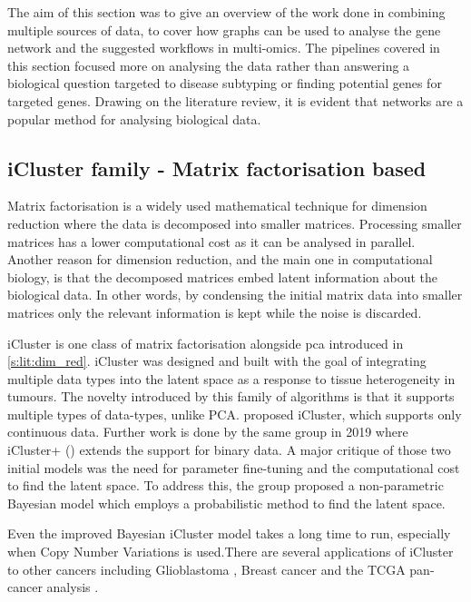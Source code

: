 The aim of this section was to give an overview of the work done in combining multiple sources of data, to cover how graphs can be used to analyse the gene network and the suggested workflows in multi-omics. The pipelines covered in this section focused more on analysing the data rather than answering a biological question targeted to disease subtyping or finding potential genes for targeted genes. Drawing on the literature review, it is evident that networks are a popular method for analysing biological data.

\subsection{iCluster family - Matrix factorisation based} \label{s:lit:iCluster}

Matrix factorisation is a widely used mathematical technique for dimension reduction where the data is decomposed into smaller matrices. Processing smaller matrices has a lower computational cost as it can be analysed in parallel. Another reason for dimension reduction, and the main one in computational biology, is that the decomposed matrices embed latent information about the biological data. In other words, by condensing the initial matrix data into smaller matrices only the relevant information is kept while the noise is discarded. 

iCluster \citep{Shen2009-ew, Mo2013-zi, Mo2018-el} is one class of matrix factorisation alongside \acrlong{pca} introduced in \cref{s:lit:dim_red}. iCluster was designed and built with the goal of integrating multiple data types into the latent space as a response to tissue heterogeneity in tumours. The novelty introduced by this family of algorithms is that it supports multiple types of data-types, unlike PCA. \citet{Shen2009-ew} proposed iCluster, which supports only continuous data. Further work is done by the same group in 2019  where iCluster+ (\citet{Mo2013-zi}) extends the support for binary data. A major critique of those two initial models was the need for parameter fine-tuning and the computational cost to find the latent space. To address this, the group proposed a non-parametric Bayesian model \citet{Mo2018-el} which employs a probabilistic method to find the latent space. 

Even the improved Bayesian iCluster model takes a long time to run, especially when Copy Number Variations is used.There are several applications of iCluster to other cancers including Glioblastoma \citep{Shen2012-yj},  Breast cancer \citep{Curtis2012-ff} and the TCGA pan-cancer analysis \citep{Hoadley2018-qe}.


